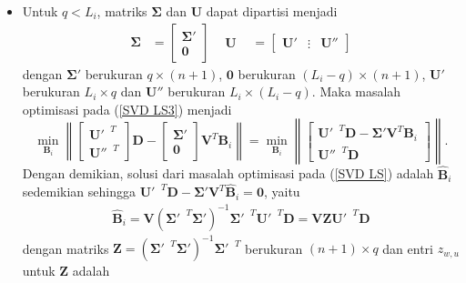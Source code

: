 \begin{itemize}
    \item Untuk $q < L_i$, matriks $\mathbf{\Sigma}$ dan $\mathbf{U}$ dapat dipartisi menjadi
    \begin{align*}
        \mathbf{\Sigma} &=
        \begin{bmatrix}
        \mathbf{\Sigma}'\\
        \mathbf{0}
        \end{bmatrix}
        &
        \begin{matrix}
        \mathbf{U}
        \end{matrix}
        &=
        \begin{bmatrix}
        \mathbf{U}' & \vdots & \mathbf{U}''
        \end{bmatrix}
    \end{align*}
    dengan $\mathbf{\Sigma}'$ berukuran $q\times (n+1)$, $\mathbf{0}$ berukuran $(L_i-q)\times (n+1)$, $\mathbf{U}'$ berukuran $L_i \times q$ dan $\mathbf{U}''$ berukuran $L_i\times(L_i-q)$. Maka masalah optimisasi pada (\ref{SVD LS3}) menjadi
    \[
    \displaystyle\underset{\mathbf{B}_i}{\min} \left\|
    \begin{bmatrix}
    \mathbf{U}'^{\text{ }T}\\
    \mathbf{U}''^{\text{ }T}
    \end{bmatrix}
    \mathbf{D} - 
    \begin{bmatrix}
    \mathbf{\Sigma}'\\
    \mathbf{0}
    \end{bmatrix}
    \mathbf{V}^T\mathbf{B}_i \right\|
    =
    \displaystyle\underset{\mathbf{B}_i}{\min} \left\|
    \begin{bmatrix}
    \mathbf{U}'^{\text{ }T}\mathbf{D} - \mathbf{\Sigma}'\mathbf{V}^T\mathbf{B}_i\\
    \mathbf{U}''^{\text{ }T}\mathbf{D}
    \end{bmatrix}
     \right\|.
    \]
    Dengan demikian, solusi dari masalah optimisasi pada (\ref{SVD LS}) adalah $\mathbf{\hat{B}}_i$ sedemikian sehingga $ \mathbf{U}'^{\text{ }T}\mathbf{D} - \mathbf{\Sigma}'\mathbf{V}^T\mathbf{\hat{B}}_i = \mathbf{0}$, yaitu
    \begin{align} \label{hasil B 1}
        \mathbf{\hat{B}}_i = \mathbf{V}\left(\mathbf{\Sigma}'^{\text{ }T}\mathbf{\Sigma}' \right)^{-1}\mathbf{\Sigma}'^{\text{ }T} \mathbf{U}'^{\text{ }T}\mathbf{D} = \mathbf{V} \mathbf{Z} \mathbf{U}'^{\text{ }T} \mathbf{D}
    \end{align}
    dengan matriks $\mathbf{Z} = \left(\mathbf{\Sigma}'^{\text{ }T}\mathbf{\Sigma}' \right)^{-1}\mathbf{\Sigma}'^{\text{ }T}$ berukuran $(n+1)\times q$ dan entri $z_{w,u}$ untuk $\mathbf{Z}$ adalah

\end{itemize}
